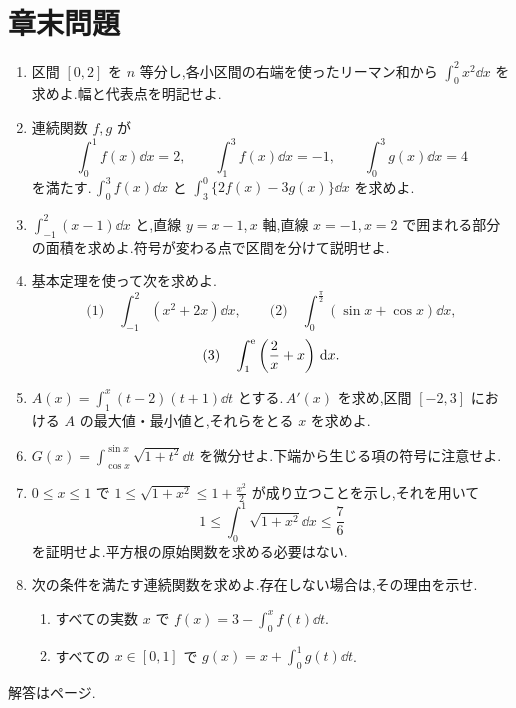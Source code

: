 \section*{章末問題}
\begin{enumerate}[label=\textbf{\thechapter.\arabic*},leftmargin=*]
 \item\label{問:定積分リーマン和} 区間 $[0,2]$ を $n$ 等分し,各小区間の右端を使ったリーマン和から $\int_0^2x^2\dd x$ を求めよ.幅と代表点を明記せよ.
 \item\label{問:定積分性質} 連続関数 $f,g$ が
 \[
  \int_0^1f(x)\dd x=2,\qquad
  \int_1^3f(x)\dd x=-1,\qquad
  \int_0^3g(x)\dd x=4
 \]
 を満たす.\,$\int_0^3f(x)\dd x$ と $\int_3^0\{2f(x)-3g(x)\}\dd x$ を求めよ.
 \item\label{問:定積分と面積} $\int_{-1}^2(x-1)\dd x$ と,直線 $y=x-1$,\,$x$ 軸,直線 $x=-1,x=2$ で囲まれる部分の面積を求めよ.符号が変わる点で区間を分けて説明せよ.
 \item\label{問:基本定理計算} 基本定理を使って次を求めよ.
 \[
  \text{(1)}\quad\int_{-1}^2(x^2+2x)\dd x,\qquad
  \text{(2)}\quad\int_0^{\frac\pi2}(\sin x+\cos x)\dd x,
 \]
 \[
  \text{(3)}\quad\int_1^{\mathrm{e}}\left(\frac2x+x\right)\,\mathrm{d} x.
 \]
 \item\label{問:面積関数増減} $A(x)=\int_1^x(t-2)(t+1)\dd t$ とする.\,$A'(x)$ を求め,区間 $[-2,3]$ における $A$ の最大値・最小値と,それらをとる $x$ を求めよ.
 \item\label{問:変数上下端} $G(x)=\int_{\cos x}^{\sin x}\sqrt{1+t^2}\dd t$ を微分せよ.下端から生じる項の符号に注意せよ.
 \item\label{問:積分の評価} $0\le x\le1$ で $1\le\sqrt{1+x^2}\le1+\frac{x^2}{2}$ が成り立つことを示し,それを用いて
 \[
  1\le\int_0^1\sqrt{1+x^2}\dd x\le\frac76
 \]
 を証明せよ.平方根の原始関数を求める必要はない.
 \item\label{問:積分方程式基本} 次の条件を満たす連続関数を求めよ.存在しない場合は,その理由を示せ.
 \begin{enumerate}[label=(\arabic*),leftmargin=*]
  \item すべての実数 $x$ で $f(x)=3-\int_0^x f(t)\dd t$.
  \item すべての $x\in[0,1]$ で $g(x)=x+\int_0^1g(t)\dd t$.
 \end{enumerate}
\end{enumerate}

\smallskip\noindent 解答は\pageref{解答:第4章}ページ.

